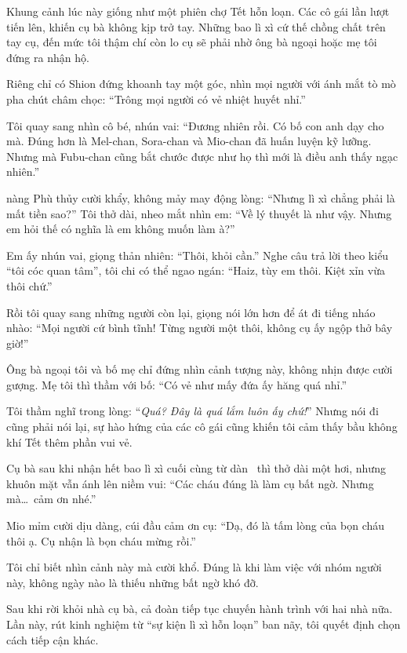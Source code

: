 \documentclass[../main.tex]{subfiles}
\begin{document}
Khung cảnh lúc này giống như một phiên chợ Tết hỗn loạn. Các cô gái lần lượt tiến lên, khiến cụ bà không kịp trở tay. Những bao lì xì cứ thế chồng chất trên tay cụ, đến mức tôi thậm chí còn lo cụ sẽ phải nhờ ông bà ngoại hoặc mẹ tôi đứng ra nhận hộ.

Riêng chỉ có Shion đứng khoanh tay một góc, nhìn mọi người với ánh mắt tò mò pha chút châm chọc: ``Trông mọi người có vẻ nhiệt huyết nhỉ.''

Tôi quay sang nhìn cô bé, nhún vai: ``Đương nhiên rồi. Có bố con anh dạy cho mà. Đúng hơn là Mel-chan, Sora-chan và Mio-chan đã huấn luyện kỹ lưỡng. Nhưng mà Fubu-chan cũng bắt chước được như họ thì mới là điều anh thấy ngạc nhiên.''

nàng Phù thủy cười khẩy, không mảy may động lòng: ``Nhưng lì xì chẳng phải là mất tiền sao?'' Tôi thở dài, nheo mắt nhìn em: ``Về lý thuyết là như vậy. Nhưng em hỏi thế có nghĩa là em không muốn làm à?''

Em ấy nhún vai, giọng thản nhiên: ``Thôi, khỏi cần.'' Nghe câu trả lời theo kiểu ``tôi cóc quan tâm'', tôi chi có thể ngao ngán: ``Haiz, tùy em thôi. Kiệt xỉn vừa thôi chứ.''

Rồi tôi quay sang những người còn lại, giọng nói lớn hơn để át đi tiếng nháo nhào: ``Mọi người cứ bình tĩnh! Từng người một thôi, không cụ ấy ngộp thở bây giờ!''

Ông bà ngoại tôi và bố mẹ chỉ đứng nhìn cảnh tượng này, không nhịn được cười gượng. Mẹ tôi thì thầm với bố: ``Có vẻ như mấy đứa ấy hăng quá nhỉ.''

Tôi thầm nghĩ trong lòng: ``\textit{Quá? Đây là quá lắm luôn ấy chứ!}'' Nhưng nói đi cũng phải nói lại, sự hào hứng của các cô gái cũng khiến tôi cảm thấy bầu không khí Tết thêm phần vui vẻ.

Cụ bà sau khi nhận hết bao lì xì cuối cùng từ dàn \hll\ thì thở dài một hơi, nhưng khuôn mặt vẫn ánh lên niềm vui: ``{\color{red}Các cháu đúng là làm cụ bất ngờ. Nhưng mà\dots\ cảm ơn nhé.}''

Mio mỉm cười dịu dàng, cúi đầu cảm ơn cụ: ``{\color{red}Dạ, đó là tấm lòng của bọn cháu thôi ạ. Cụ nhận là bọn cháu mừng rồi.}''

Tôi chỉ biết nhìn cảnh này mà cười khổ. Đúng là khi làm việc với nhóm người này, không ngày nào là thiếu những bất ngờ khó đỡ.

\ct

Sau khi rời khỏi nhà cụ bà, cả đoàn tiếp tục chuyến hành trình với hai nhà nữa. Lần này, rút kinh nghiệm từ ``sự kiện lì xì hỗn loạn'' ban nãy, tôi quyết định chọn cách tiếp cận khác.
\end{document}
